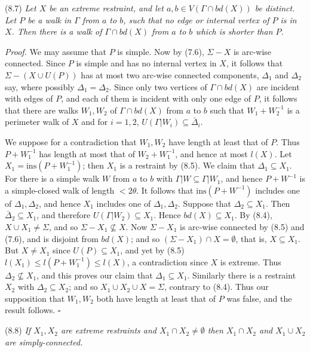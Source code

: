 \stmt
(8.7) \textit{Let $X$ be an extreme restraint, and let $a, b \in V(\Gamma \cap bd(X))$ be distinct. Let $P$ be a walk in $\Gamma$ from $a$ to $b$, such that no edge or internal vertex of $P$ is in $X$. Then there is a walk of $\Gamma \cap bd(X)$ from $a$ to $b$ which is shorter than $P$.}

\textit{Proof.} We may assume that $P$ is simple. Now by (7.6), $\Sigma - X$ is arc-wise connected. Since $P$ is simple and has no internal vertex in $X$, it follows that $\Sigma - (X \cup U(P))$ has at most two arc-wise connected components, $\Delta_1$ and $\Delta_2$ say, where possibly $\Delta_1 = \Delta_2$. Since only two vertices of $\Gamma \cap bd(X)$ are incident with edges of $P$, and each of them is incident with only one edge of $P$, it follows that there are walks $W_1, W_2$ of $\Gamma \cap bd(X)$ from $a$ to $b$ such that $W_1 + W_2^{-1}$ is a perimeter walk of $X$ and for $i = 1, 2$, $U(\Gamma | W_i) \subseteq \bar{\Delta}_i$.

We suppose for a contradiction that $W_1, W_2$ have length at least that of $P$. Thus $P + W_1^{-1}$ has length at most that of $W_2 + W_1^{-1}$, and hence at most $l(X)$. Let $X_1 = \mathrm{ins}(P + W_1^{-1})$; then $X_1$ is a restraint by (8.5). We claim that $\Delta_1 \subseteq X_1$. For there is a simple walk $W$ from $a$ to $b$ with $\Gamma | W \subseteq \Gamma | W_1$, and hence $P + W^{-1}$ is a simple-closed walk of length $< 2\theta$. It follows that $\mathrm{ins}(P + W^{-1})$ includes one of $\Delta_1, \Delta_2$, and hence $X_1$ includes one of $\Delta_1, \Delta_2$. Suppose that $\Delta_2 \subseteq X_1$. Then $\bar{\Delta}_2 \subseteq X_1$, and therefore $U(\Gamma | W_2) \subseteq X_1$. Hence $bd(X) \subseteq X_1$. By (8.4), $X \cup X_1 \ne \Sigma$, and so $\Sigma - X_1 \nsubseteq X$. Now $\Sigma - X_1$ is arc-wise connected by (8.5) and (7.6), and is disjoint from $bd(X)$; and so $(\Sigma - X_1) \cap X = \emptyset$, that is, $X \subseteq X_1$. But $X \ne X_1$ since $U(P) \subseteq X_1$, and yet by (8.5) $l(X_1) \le l(P + W_1^{-1}) \le l(X)$, a contradiction since $X$ is extreme. Thus $\Delta_2 \nsubseteq X_1$, and this proves our claim that $\Delta_1 \subseteq X_1$. Similarly there is a restraint $X_2$ with $\Delta_2 \subseteq X_2$; and so $X_1 \cup X_2 \cup X = \Sigma$, contrary to (8.4). Thus our supposition that $W_1, W_2$ both have length at least that of $P$ was false, and the result follows. $\square$

\stmt
(8.8) \textit{If $X_1, X_2$ are extreme restraints and $X_1 \cap X_2 \ne \emptyset$ then $X_1 \cap X_2$ and $X_1 \cup X_2$ are simply-connected.}

